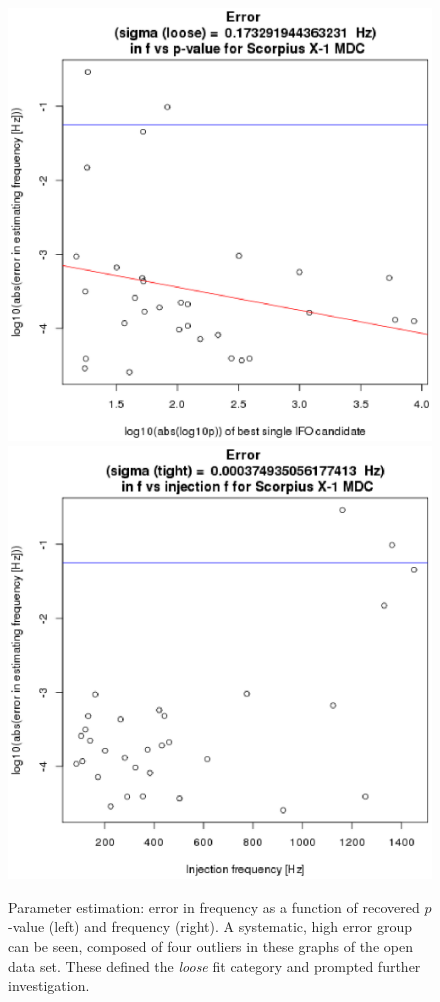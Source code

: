 \begin{figure}
\begin{center}
\includegraphics[width=0.3\paperwidth,height=0.2\paperheight]{ErrorF.eps}
\includegraphics[width=0.3\paperwidth,height=0.2\paperheight]{ErrorFvsF.eps}
\caption{Parameter estimation: error in frequency as a function of recovered $p$-value (left) and frequency (right). A systematic, high error group can be seen, composed of four outliers in these graphs of the open data set. These defined the \textit{loose} fit category and prompted further investigation.
}
\end{center}
\end{figure}



